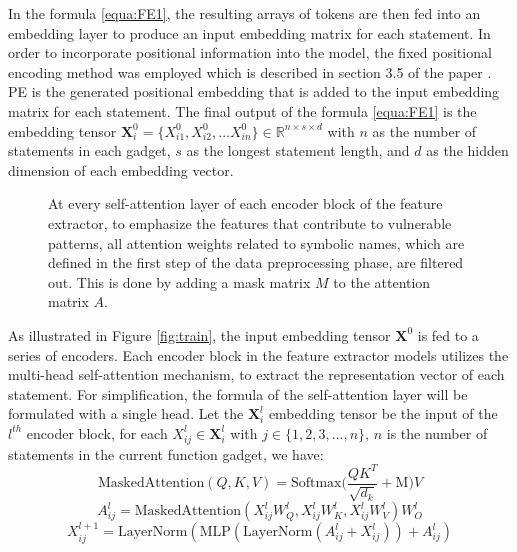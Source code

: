 \documentclass{ieeeaccess}
\begin{document}
In the formula \ref{equa:FE1},  the resulting arrays of tokens are then fed into an embedding layer to produce an input embedding matrix  for each statement.  In order to incorporate positional information into the model, the fixed positional encoding method was employed which is described in section 3.5 of the paper \cite{attention}. PE is the generated positional embedding  that is added to the input embedding matrix for each statement. The final output of the formula \ref{equa:FE1} is the embedding tensor  $\mathbf{X}_i^0=\{X_{i1}^0, X_{i2}^0,...X_{in}^0\} \in \mathbb{R}^{n \times s \times d}$  with  $n$ as the number of statements in each gadget, $s$ as the longest statement length, and $d$ as the hidden dimension of each embedding vector.
\begin{figure}[h]
    \centering
    
    \caption{At every self-attention layer of each encoder block of the feature extractor, to emphasize the features that contribute to vulnerable patterns,  all attention weights related to symbolic names, which are defined in the first step of the data preprocessing phase, are filtered out. This is done by adding a mask matrix $M$ to the attention matrix $A$.
   } \label{fig:mask}
\end{figure}
\par As illustrated in Figure \ref{fig:train}, the input embedding tensor $\mathbf{X}^0$ is fed to a series of encoders. Each encoder block in the feature extractor models utilizes the multi-head self-attention mechanism, to extract the representation vector of each statement. For simplification, the formula of the self-attention layer will be formulated with a single head. Let the $\mathbf{X}_i^l$ embedding tensor be the input of the $l^{th}$ encoder block, for each $X_{ij}^l \in \mathbf{X}_i^l$ with $j\in\{1,2,3,...,n\}$, $n$ is the number of statements in the current function gadget, we have:
\begin{equation} \label{equa:FE2}
\text{MaskedAttention}(Q,K,V) = \text{Softmax}\bigg(\frac{QK^T}{\sqrt{d_k}} + \text{M}\bigg) V\end{equation}
\begin{equation} \label{equa:FE3}
A_{ij}^{l} = \text{MaskedAttention}(X_{ij}^lW_Q^l, X_{ij}^lW_K^l, X_{ij}^lW_V^l)W^l_O
\end{equation}
\begin{equation}\label{equa:FE4}
X_{ij}^{l+1} = \text{LayerNorm}(\text{MLP}( \text{LayerNorm}(A_{ij}^{l} +X_{ij}^l))+ A_{ij}^l)\end{equation}
\end{document}
